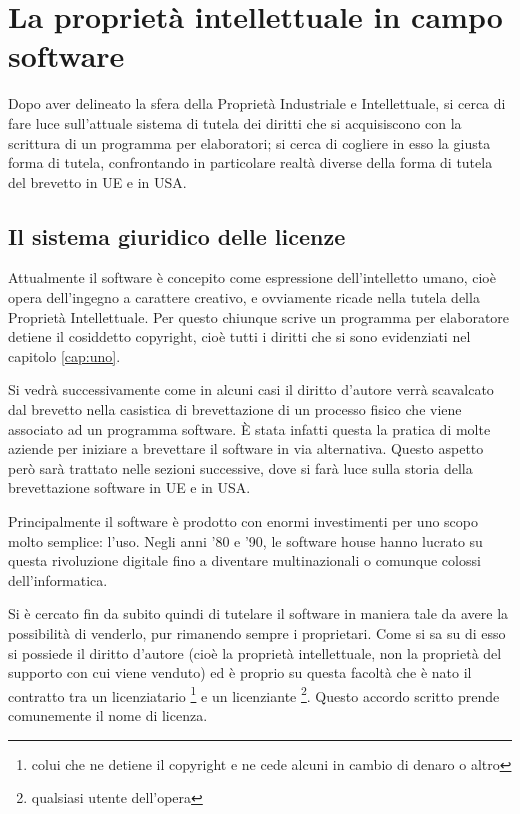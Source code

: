 \chapter{La proprietà intellettuale in campo software}
Dopo aver delineato la sfera della Proprietà Industriale e Intellettuale, si cerca di fare luce sull'attuale sistema di tutela dei diritti che si acquisiscono con la scrittura di un programma per elaboratori; si cerca di cogliere in esso la giusta forma di tutela,  confrontando in particolare realtà diverse della forma di tutela del brevetto in UE e in USA.

\section{Il sistema giuridico delle licenze} \label{sec:sistema-licenze}
Attualmente il software è concepito come espressione dell'intelletto umano, cioè opera dell'ingegno a carattere creativo, e ovviamente ricade nella tutela della Proprietà Intellettuale. Per questo chiunque scrive un programma per elaboratore detiene il cosiddetto copyright, cioè tutti i diritti che si sono evidenziati nel capitolo \ref{cap:uno}.

Si vedrà successivamente come in alcuni casi il diritto d'autore verrà scavalcato dal brevetto nella casistica di brevettazione di un processo fisico che viene associato ad un programma software. \`E stata infatti questa la pratica di molte aziende per iniziare a brevettare il software in via alternativa. Questo aspetto però sarà trattato nelle sezioni successive, dove si farà luce sulla storia della brevettazione software in UE e in USA.

Principalmente il software è prodotto con enormi investimenti per uno scopo molto semplice: l'uso. Negli anni '80 e '90, le software house hanno lucrato su questa rivoluzione digitale fino a diventare multinazionali o comunque colossi dell'informatica.

Si è cercato fin da subito quindi di tutelare il software in maniera tale da avere la possibilità di venderlo, pur rimanendo sempre i proprietari. Come si sa su di esso si possiede il diritto d'autore (cioè la proprietà intellettuale, non la proprietà del supporto con cui viene venduto) ed è proprio su questa facoltà che è nato il contratto tra un licenziatario \footnote{colui che ne detiene il copyright e ne cede alcuni in cambio di denaro o altro} e un licenziante \footnote{qualsiasi utente dell'opera}. Questo accordo scritto prende comunemente il nome di licenza.

